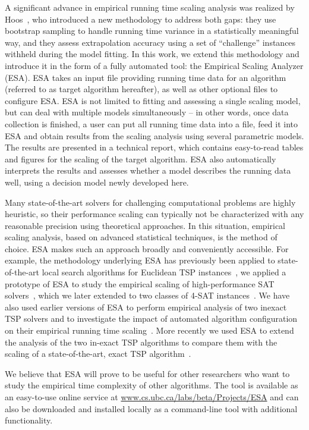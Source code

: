 \documentclass[aic]{iosart2x}
\begin{document}
A significant advance in empirical running time scaling analysis was realized by Hoos~\cite{Hoo09}, who introduced a new methodology to address both gaps: they use bootstrap sampling to handle running time variance in a statistically meaningful way, and they assess extrapolation accuracy using a set of ``challenge'' instances withheld during the model fitting.  In this work, we extend this methodology and introduce it in the form of a fully automated tool: the Empirical Scaling Analyzer (ESA). ESA takes an input file providing running time data for an algorithm (referred to as target algorithm hereafter), as well as other optional files to configure ESA. ESA is not limited to fitting and assessing a single scaling model, but can deal with multiple models simultaneously -- in other words, once data collection is finished, a user can put all running time data into a file, feed it into ESA and obtain results from the scaling analysis using several parametric models. The results are presented in a technical report, which contains easy-to-read tables and figures for the scaling of the target algorithm. ESA also automatically interprets the results and assesses whether a model describes the running data well, using a decision model newly developed here.

Many state-of-the-art solvers for challenging computational problems are highly heuristic, so their performance scaling can typically not be characterized with any reasonable precision using theoretical approaches. In this situation, empirical scaling analysis, based on advanced statistical techniques, is the method of choice. ESA makes such an approach broadly and conveniently accessible. For example, the methodology underlying ESA has previously been applied to state-of-the-art local search algorithms for Euclidean TSP instances~\cite{DubEtAl15}, we applied a prototype of ESA to study the empirical scaling of high-performance SAT solvers~\cite{MuHoo15}, which we later extended to two classes of 4-SAT instances~\cite{Mu15}. We have also used earlier versions of ESA to perform empirical analysis of two inexact TSP solvers and to investigate the impact of automated algorithm configuration on their empirical running time scaling~\cite{MuEtAl16,Mu15}. More recently we used ESA to extend the analysis of the two in-exact TSP algorithms to compare them with the scaling of a state-of-the-art, exact TSP algorithm~\cite{MuEtAl17}.

We believe that ESA will prove to be useful for other researchers who want to study the empirical time complexity of other algorithms. The tool is available as an easy-to-use online service at \url{www.cs.ubc.ca/labs/beta/Projects/ESA} and can also be downloaded and installed locally as a command-line tool with additional functionality.
\end{document}
